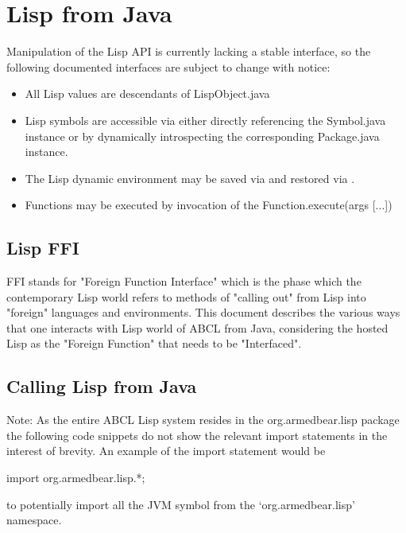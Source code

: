 \documentclass[10pt]{book}
\begin{document}
\section{Lisp from Java}

Manipulation of the Lisp API is currently lacking a stable interface,
so the following documented interfaces are subject to change with
notice:

\begin{itemize}
\item All Lisp values are descendants of LispObject.java
\item Lisp symbols are accessible via either directly referencing the
  Symbol.java instance or by dynamically introspecting the
  corresponding Package.java instance.
\item The Lisp dynamic environment may be saved via
   and restored via
  .
\item Functions may be executed by invocation of the
  Function.execute(args [...]) 
\end{itemize}

\subsection{Lisp FFI}

FFI stands for "Foreign Function Interface" which is the phase which
the contemporary Lisp world refers to methods of "calling out" from
Lisp into "foreign" languages and environments.  This document
describes the various ways that one interacts with Lisp world of ABCL
from Java, considering the hosted Lisp as the "Foreign Function" that
needs to be "Interfaced".

\subsection{Calling Lisp from Java}

Note: As the entire ABCL Lisp system resides in the org.armedbear.lisp
package the following code snippets do not show the relevant import
statements in the interest of brevity.  An example of the import
statement would be

\begin{listing-java}
  import org.armedbear.lisp.*;
\end{listing-java}

to potentially import all the JVM symbol from the `org.armedbear.lisp'
namespace.
\end{document}
